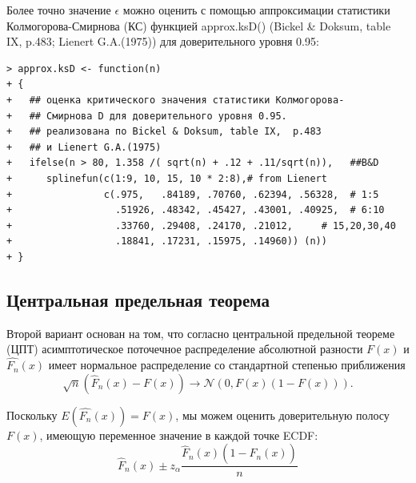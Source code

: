 \documentclass[14pt,a4paper]{scrartcl}
\begin{document}
Более точно значение $\epsilon$ можно оценить с помощью аппроксимации статистики Колмогорова-Смирнова (КС) функцией approx.ksD() (Bickel \& Doksum, table IX,  p.483; Lienert G.A.(1975)) для доверительного уровня 0.95:

\begin{verbatim}
> approx.ksD <- function(n) 
+ {
+   ## оценка критического значения статистики Колмогорова-
+   ## Смирнова D для доверительного уровня 0.95.
+   ## реализована по Bickel & Doksum, table IX,  p.483
+   ## и Lienert G.A.(1975) 
+   ifelse(n > 80, 1.358 /( sqrt(n) + .12 + .11/sqrt(n)),   ##B&D
+      splinefun(c(1:9, 10, 15, 10 * 2:8),# from Lienert
+                c(.975,   .84189, .70760, .62394, .56328,  # 1:5
+                  .51926, .48342, .45427, .43001, .40925,  # 6:10
+                  .33760, .29408, .24170, .21012,     # 15,20,30,40
+                  .18841, .17231, .15975, .14960)) (n))
+ }
\end{verbatim}

\subsection{Центральная предельная теорема}
Второй вариант основан на том, что согласно центральной предельной теореме (ЦПТ) асимптотическое поточечное распределение абсолютной разности $F(x)$ и $\hat{F_n}(x)$ имеет нормальное распределение со стандартной степенью приближения
\begin{equation*}
	\sqrt{n}\left(\hat{F}_{n}(x)-F(x)\right) \rightarrow \mathcal{N}(0, F(x)(1-F(x))).
\end{equation*}

Поскольку $E(\hat{F_n}(x)) = F(x)$, мы можем оценить доверительную полосу $F(x)$, имеющую переменное значение в каждой точке ECDF:
\begin{equation*}
	\hat{F}_{n}(x) \pm z_{\alpha} \frac{\hat{F}_{n}(x)\left(1-\hat{F}_{n}(x)\right)}{n}
\end{equation*}
\end{document}
